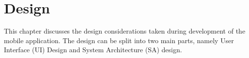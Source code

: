 \chapter{Design}
\label{Chapter:Design}

This chapter discusses the design considerations taken during development of the mobile application. The design can be split into two main parts, namely User Interface (UI) Design and System Architecture (SA) design.
